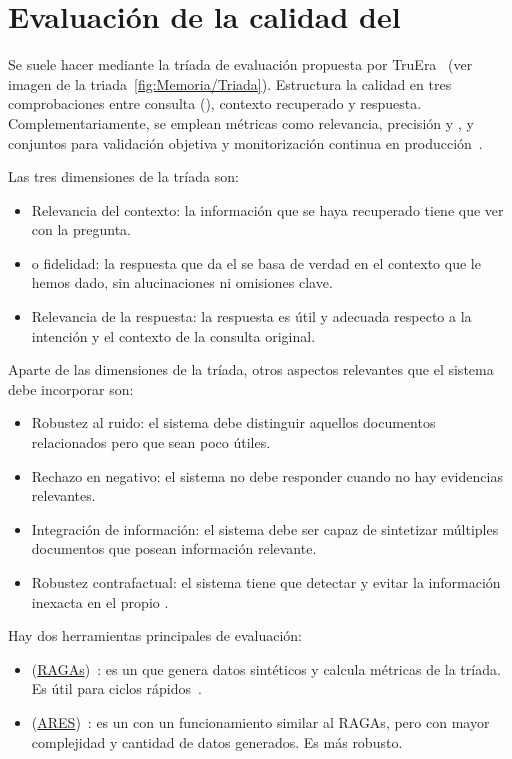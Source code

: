 \section{Evaluación de la calidad del }
Se suele hacer mediante la tríada de evaluación propuesta por TruEra~\cite{RAG:triad} (ver imagen de la triada~\ref{fig:Memoria/Triada}). Estructura la calidad en tres comprobaciones entre consulta (), contexto recuperado y respuesta. Complementariamente, se emplean métricas como relevancia, precisión y , y conjuntos  para validación objetiva y monitorización continua en producción~\cite{book:RAG_SimpleGuide}.


Las tres dimensiones de la tríada son:
\begin{itemize}
\tightlist
	\item Relevancia del contexto: la información que se haya recuperado tiene que ver con la pregunta.
	\item {} o fidelidad: la respuesta que da el  se basa de verdad en el contexto que le hemos dado, sin alucinaciones ni omisiones clave.
	\item Relevancia de la respuesta: la respuesta es útil y adecuada respecto a la intención y el contexto de la consulta original.
\end{itemize}

Aparte de las dimensiones de la tríada, otros aspectos relevantes que el sistema debe incorporar son:
\begin{itemize}
\tightlist
	\item Robustez al ruido: el sistema debe distinguir aquellos documentos relacionados pero que sean poco útiles.
	\item Rechazo en negativo: el sistema no debe responder cuando no hay evidencias relevantes.
	\item Integración de información: el sistema debe ser capaz de sintetizar múltiples documentos que posean información relevante.
	\item Robustez contrafactual: el sistema tiene que detectar y evitar la información inexacta en el propio .
\end{itemize}

Hay dos herramientas principales de evaluación:
\begin{itemize}
\tightlist
	\item {} (\href{https://github.com/vibrantlabsai/ragas}{RAGAs})~\cite{paper_ragas}: es un  que genera datos sintéticos y calcula métricas de la tríada. Es útil para ciclos rápidos~\cite{ragas:docs}. 
	\item {} (\href{https://github.com/stanford-futuredata/ARES/tree/main?tab=readme-ov-file}{ARES})~\cite{saadfalcon2024ares}: es un  con un funcionamiento similar al RAGAs, pero con mayor complejidad y cantidad de datos generados. Es más robusto.
\end{itemize}
